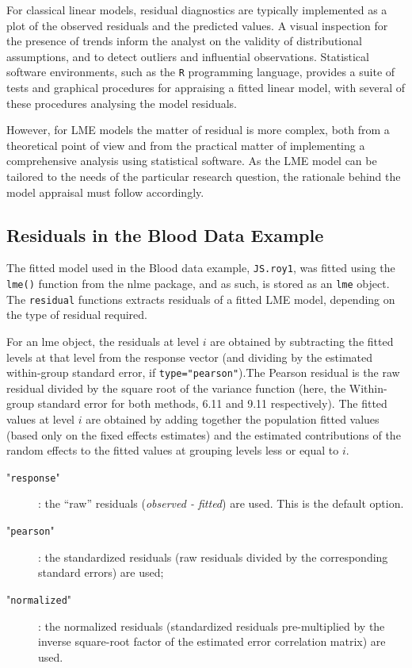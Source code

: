 \documentclass[Main.tex]{subfiles}
\begin{document}
For classical linear models, residual diagnostics are typically implemented as a plot of the observed residuals and the predicted values. A visual inspection for the presence of trends inform the analyst on the validity of distributional assumptions, and to detect outliers and influential observations. Statistical software environments, such as the \texttt{R} programming language, provides a suite of tests and graphical procedures for appraising a fitted linear model, with several 
of these procedures analysing the model residuals.

However, for LME models the matter of residual is more complex, both from a theoretical point of view and from the practical matter of implementing a comprehensive analysis using statistical software. As the LME model can be tailored to the needs of the particular research question, the rationale behind the model appraisal must follow accordingly.


\subsection{Residuals in the Blood Data Example}
The fitted model used in the Blood data example, \texttt{JS.roy1}, was fitted using the \texttt{lme()} function from the nlme package, and as such, is stored as an \texttt{lme} object. The \texttt{residual} functions extracts residuals of a fitted LME model, depending on the type of residual required.

For an lme object, the residuals at level $i$ are obtained by subtracting the fitted levels at that level from the response vector (and dividing by the estimated within-group standard error, if \texttt{type="pearson"}).The Pearson residual is the raw residual divided by the square root of the variance function (here, the Within-group standard error for both methods, 6.11 and 9.11 respectively). The fitted values at level $i$ are obtained by adding together the population fitted values (based only on the fixed effects estimates) and the estimated contributions of the random effects to the fitted values at grouping levels less or equal to $i$.

\begin{description}
	\item["\texttt{response}"]: the “raw” residuals (\textit{observed - fitted}) are used. This is the default option.
	\item["\texttt{pearson}"]: the standardized residuals (raw residuals divided by the corresponding standard errors) are used; 
	\item["\texttt{normalized}"]: the normalized residuals (standardized residuals pre-multiplied by the inverse square-root factor of the estimated error correlation matrix) are used.
\end{description}
\end{document}
